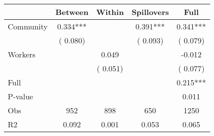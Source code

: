 
\begin{tabular}{l*{4}{c}}\hline&\multicolumn{1}{c}{Between}&\multicolumn{1}{c}{Within}&\multicolumn{1}{c}{Spillovers}&\multicolumn{1}{c}{Full}\\ \hline
 Community             &              0.334***      &                                               &        0.391*** &         0.341***                            \\ 
                               &        (       0.080)           &                                       &       (       0.093)     &      (       0.079)                                           \\ 
 Workers       &                                               &        0.049    &                                &            -0.012                            \\ 
                               &                                               & (       0.051)                  &                                        &      (       0.077)                                           \\ 
\hline                                                                                                                                                                                                                                            
 Full                  &                                               &                                               &                                        &             0.215***                                     \\ 
 P-value               &                                               &                                               &                                        &             0.011                                           \\ 
 Obs                   &               952               &       898                       &       650                &              1250                                               \\ 
 R2                    &                      0.092              &              0.001                      &              0.053               &                     0.065                                              \\ 
\hline \end{tabular}                                                                                                                                                                                                              